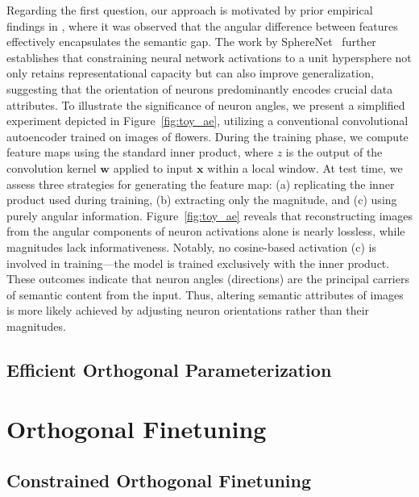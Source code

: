 \begin{itemize}[leftmargin=*,nosep]
Regarding the first question, our approach is motivated by prior empirical findings in \cite{liu2018decoupled,chen2020angular}, where it was observed that the angular difference between features effectively encapsulates the semantic gap. The work by SphereNet~\cite{liu2017deep} further establishes that constraining neural network activations to a unit hypersphere not only retains representational capacity but can also improve generalization, suggesting that the orientation of neurons predominantly encodes crucial data attributes. To illustrate the significance of neuron angles, we present a simplified experiment depicted in Figure~\ref{fig:toy_ae}, utilizing a conventional convolutional autoencoder trained on images of flowers. During the training phase, we compute feature maps using the standard inner product, where $z$ is the output of the convolution kernel $\bm{w}$ applied to input $\bm{x}$ within a local window. At test time, we assess three strategies for generating the feature map: (a) replicating the inner product used during training, (b) extracting only the magnitude, and (c) using purely angular information. Figure~\ref{fig:toy_ae} reveals that reconstructing images from the angular components of neuron activations alone is nearly lossless, while magnitudes lack informativeness. Notably, no cosine-based activation (c) is involved in training—the model is trained exclusively with the inner product. These outcomes indicate that neuron angles (directions) are the principal carriers of semantic content from the input. Thus, altering semantic attributes of images is more likely achieved by adjusting neuron orientations rather than their magnitudes.

\subsection{Efficient Orthogonal Parameterization}\label{sect:eff_ortho}

\section{Orthogonal Finetuning}

\subsection{Constrained Orthogonal Finetuning}


\end{itemize}
